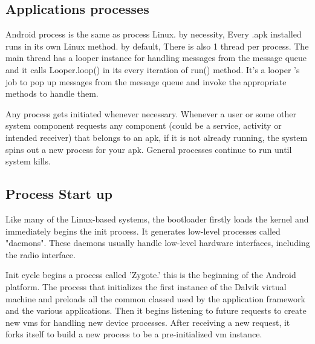 \documentclass[preprint,12pt]{elsarticle}
\begin{document}






\subsection{Applications processes}
Android process is the same as process Linux. by necessity, Every .apk installed runs in its own Linux method. by default, There is also 1 thread per process. The main thread has a looper instance for handling messages from the message queue and it calls Looper.loop() in its every iteration of run() method. It's a looper 's job to pop up messages from the message queue and invoke the appropriate methods to handle them. 

Any process gets initiated whenever necessary. Whenever a user or some other system component requests any component (could be a service, activity or intended receiver) that belongs to an apk, if it is not already running, the system spins out a new process for your apk. General processes continue to run until system kills.

\subsection{Process Start up} 
Like many of the Linux-based systems, the bootloader firstly loads the kernel and immediately begins the init process. It generates low-level processes called "daemons". These daemons usually handle low-level hardware interfaces, including the radio interface.

Init cycle begins a process called 'Zygote.'  this is the beginning of the Android platform. The process that initializes the first instance of the Dalvik virtual machine and preloads all the common classed used by the application framework and the various applications. Then it begins listening to future requests to create new vms for handling new device processes. After receiving a new request, it forks itself to build a new process to be a pre-initialized vm instance. 
\end{document}
